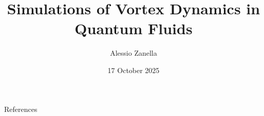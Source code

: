 \documentclass[aspectratio=169]{beamer}
\title{Simulations of Vortex Dynamics in Quantum Fluids}
\author{Alessio Zanella}
\institute{University of Verona}
\date{17 October 2025}
\begin{document}
\begin{frame}
    \titlepage
\end{frame}




\appendix

\begin{frame}[allowframebreaks]{References}
    
    
\end{frame}
\end{document}
